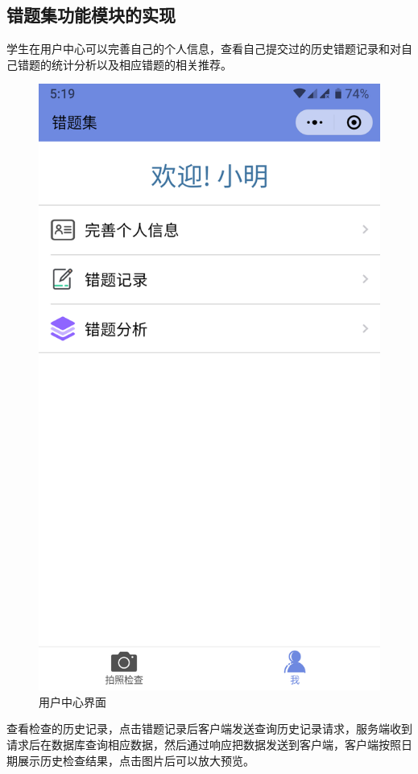 \subsection{错题集功能模块的实现}
学生在用户中心可以完善自己的个人信息，查看自己提交过的历史错题记录和对自己错题的统计分析以及相应错题的相关推荐。

\begin{figure}[h!]
	\centering
	\includegraphics[width=108bp, height = 192bp]{picture/user.png}
	\caption{用户中心界面}
	\label{fig:}
\end{figure}
\newpage
查看检查的历史记录，点击错题记录后客户端发送查询历史记录请求，服务端收到请求后在数据库查询相应数据，然后通过响应把数据发送到客户端，客户端按照日期展示历史检查结果，点击图片后可以放大预览。

